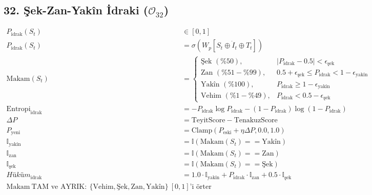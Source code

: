 \documentclass[11pt, a4paper]{article}
\begin{document}
\subsection{32. Şek-Zan-Yakîn İdraki ($\mathcal{O}_{32}$)}
\begin{align}
P_{\text{idrak}}(S_t) &\in [0, 1] \\
P_{\text{idrak}}(S_t) &= \sigma\left( W_p [S_t \oplus \dot{I}_t \oplus T_t] \right) \\
\text{Makam}(S_t) &= 
\begin{cases}
\text{Şek } (\%50), & |P_{\text{idrak}} - 0.5| < \epsilon_{\text{şek}} \\
\text{Zan } (\%51-\%99), & 0.5 + \epsilon_{\text{şek}} \le P_{\text{idrak}} < 1 - \epsilon_{\text{yakîn}} \\
\text{Yakîn } (\%100), & P_{\text{idrak}} \ge 1 - \epsilon_{\text{yakîn}} \\
\text{Vehim } (\%1-\%49), & P_{\text{idrak}} < 0.5 - \epsilon_{\text{şek}}
\end{cases} \\
\text{Entropi}_{\text{idrak}} &= -P_{\text{idrak}} \log P_{\text{idrak}} - (1-P_{\text{idrak}}) \log (1-P_{\text{idrak}}) \\
\Delta P &= \text{TeyitScore} - \text{TenakuzScore} \\
P_{\text{yeni}} &= \text{Clamp}(P_{\text{eski}} + \eta \Delta P, 0.0, 1.0) \\
\mathbb{I}_{\text{yakîn}} &= \mathbb{I}(\text{Makam}(S_t) == \text{Yakîn}) \\
\mathbb{I}_{\text{zan}} &= \mathbb{I}(\text{Makam}(S_t) == \text{Zan}) \\
\mathbb{I}_{\text{şek}} &= \mathbb{I}(\text{Makam}(S_t) == \text{Şek}) \\
Hüküm_{\text{idrak}} &= 1.0 \cdot \mathbb{I}_{\text{yakîn}} + P_{\text{idrak}} \cdot \mathbb{I}_{\text{zan}} + 0.5 \cdot \mathbb{I}_{\text{şek}} \\
\text{Makam} \ \text{TAM ve AYRIK}: \ \{\text{Vehim}, \text{Şek}, \text{Zan}, \text{Yakîn}\} \ [0,1]\text{'i örter}
\end{align}
\end{document}
